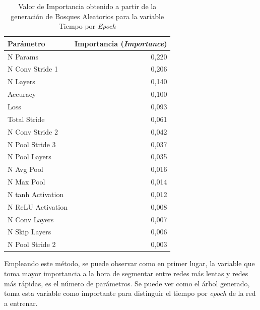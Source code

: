 \begin{itemize}
    \begin{table}[h]
    \caption{Valor de Importancia obtenido a partir de la generación de Bosques Aleatorios para la variable Tiempo por \textit{Epoch}}
    \label{tab:rf_importance}
    \centering
    \begin{tabular}{l|r}
    \toprule
    \textbf{Parámetro} & \textbf{Importancia (\textit{Importance})} \\ \hline
    N Params           & 0,220                             \\
    N Conv Stride 1    & 0,206                             \\
    N Layers           & 0,140                             \\
    Accuracy           & 0,100                             \\
    Loss               & 0,093                             \\
    Total Stride       & 0,061                             \\
    N Conv Stride 2    & 0,042                             \\
    N Pool Stride 3    & 0,037                             \\
    N Pool Layers      & 0,035                             \\
    N Avg Pool         & 0,016                             \\
    N Max Pool         & 0,014                             \\
    N tanh Activation  & 0,012                             \\
    N ReLU Activation  & 0,008                             \\
    N Conv Layers      & 0,007                             \\
    N Skip Layers      & 0,006                             \\
    N Pool Stride 2    & 0,003   \\
    \bottomrule
    \end{tabular}
    \end{table}
    
    Empleando este método, se puede observar como en primer lugar, la variable que toma mayor importancia a la hora de segmentar entre redes más lentas y redes más rápidas, es el número de parámetros. Se puede ver como el árbol generado, toma esta variable como importante para distinguir el tiempo por \textit{epoch} de la red a entrenar.
    

\end{itemize}
